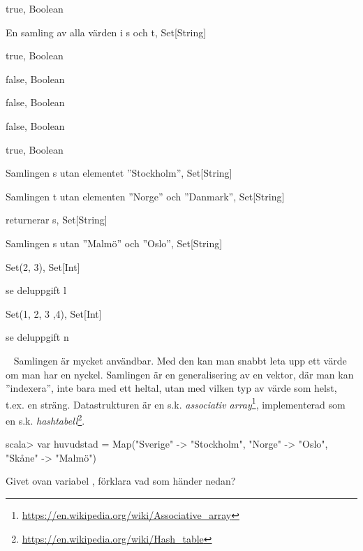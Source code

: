 {{\Subtask {}

\Subtask {}

\Subtask {}

\Subtask {}

\Subtask {}

\Subtask {}

\Subtask {}


\SOLUTION


\TaskSolved \what
 

\SubtaskSolved 
true, Boolean

\SubtaskSolved 
En samling av alla värden i s och t, Set[String]

\SubtaskSolved 
true, Boolean

\SubtaskSolved 
false, Boolean

\SubtaskSolved 
false, Boolean

\SubtaskSolved 
false, Boolean

\SubtaskSolved 
true, Boolean

\SubtaskSolved 
Samlingen s utan elementet ''Stockholm'', Set[String]

\SubtaskSolved 
Samlingen t utan elementen ''Norge'' och ''Danmark'', Set[String]

\SubtaskSolved 
returnerar s, Set[String]

\SubtaskSolved 
Samlingen s utan ''Malmö'' och ''Oslo'', Set[String]

\SubtaskSolved 
Set(2, 3), Set[Int]

\SubtaskSolved 
se deluppgift l

\SubtaskSolved 
Set(1, 2, 3 ,4), Set[Int]

\SubtaskSolved 
se deluppgift n


\QUESTEND









\QUESTBEGIN

\Task  \what~  Samlingen  är mycket användbar. Med den kan man snabbt leta upp ett värde om man har en nyckel. Samlingen  är en generalisering av en vektor, där man kan ''indexera'', inte bara med ett heltal, utan med vilken typ av värde som helst, t.ex. en sträng. Datastrukturen  är en s.k. \emph{associativ array}\footnote{\href{https://en.wikipedia.org/wiki/Associative_array}{https://en.wikipedia.org/wiki/Associative\_array}}, implementerad som en s.k. \emph{hashtabell}\footnote{\href{https://en.wikipedia.org/wiki/Hash_table}{https://en.wikipedia.org/wiki/Hash\_table}}.
\begin{REPL}
scala> var huvudstad =
  Map("Sverige" -> "Stockholm", "Norge" -> "Oslo", "Skåne" -> "Malmö")
\end{REPL}
Givet ovan variabel , förklara vad som händer nedan?

}}
